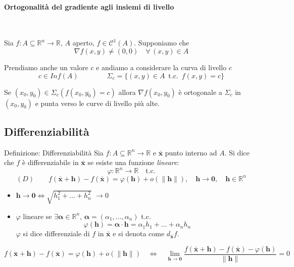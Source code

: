 \documentclass[x11names]{article}
\begin{document}
	\paragraph{Ortogonalità del gradiente agli insiemi di livello}~ \medskip
	
	\noindent Sia \(f:A\subseteq \mathbb{R}^n \to \mathbb{R}\), \(A\) aperto, \(f\in \mathcal{C}^1(A)\). Supponiamo che
	\[ 
	\nabla f(x,y) \neq(0,0) \quad \forall\, (x,y) \in A
	\]
	
	\noindent Prendiamo anche un valore \(c\) e andiamo a considerare la curva di livello \(c\)
	\[ 
	c \in Inf(A)  \qquad \qquad \Sigma_{c} = \{(x,y) \in A \;\ \text{t.c.} \;\ f(x,y) = c\} 
	\] 
	
	\noindent Se \((x_{0},y_{0}) \in \Sigma_{c} \left( f(x_{0},y_{0}) = c \right)\) allora \(\nabla f (x_{0},y_{0})\) è ortogonale a \(\Sigma_{c}\) in \((x_{0},y_{0})\) e punta verso le curve di livello più alte.
	
	\subsection{\textbf{Differenziabilità}}
	\begin{center}
		\colorbox{myblue}{\begin{minipage}{5.75in}
				\begin{blues}{Definizione: Differenziabilità}
					Sia \(f: A\subseteq \mathbb{R}^n \to \mathbb{R}\) e \(\boldsymbol{\bar{x}}\) punto interno ad \(A\). Si dice che \(f\) è differenziabile in \(\boldsymbol{\bar{x}}\) se esiste una funzione \textit{lineare}: 
					\[ 
					\varphi: \mathbb{R}^n \to \mathbb{R} \quad \text{t.c.}
					\]
					\[ 
					(D) \qquad f(\boldsymbol{\bar{x}} + \boldsymbol{h}) - f(\boldsymbol{\bar{x}}) = \varphi(\boldsymbol{h}) + o(\|\boldsymbol{h}\|), \quad \boldsymbol{h} \to \boldsymbol{0}, \quad \boldsymbol{h} \in \mathbb{R}^n
					\]
					
					\begin{itemize}
						\item \(\boldsymbol{h} \to \boldsymbol{0} \Longleftrightarrow \sqrt{h_{1}^2 + \dots + h_{n}^2}\) $\to 0$ 
						\item \(\varphi\) lineare se \(\exists \boldsymbol{\alpha} \in \mathbb{R}^n\), \(\boldsymbol{\alpha} = (\alpha_1, \dots, \alpha_{n})\) t.c. 
						\[ 
						\varphi(\boldsymbol{h}) = \boldsymbol{\alpha} \cdot \boldsymbol{h} = \alpha_1 h_{1} + \dots + \alpha_n h_{n}
						\]
						\(\varphi\) si dice differenziale di \(f\) in \(\boldsymbol{\bar{x}}\) e si denota come \(d_{\boldsymbol{\bar{x}}}f\).
					\end{itemize}
					\[ 
					f(\boldsymbol{\bar{x}} + \boldsymbol{h}) - f(\boldsymbol{\bar{x}}) = \varphi(\boldsymbol{h}) + o(\|\boldsymbol{h}\|)\quad \Longleftrightarrow \quad\lim_{\boldsymbol{h\to\boldsymbol{0}}} \frac{f(\boldsymbol{\bar{x}} + \boldsymbol{h}) - f(\boldsymbol{\bar{x}}) - \varphi(\boldsymbol{h})}{\|\boldsymbol{h}\|} = 0
					\]
				\end{blues}
		\end{minipage}}       
	\end{center}
	
\end{document}
